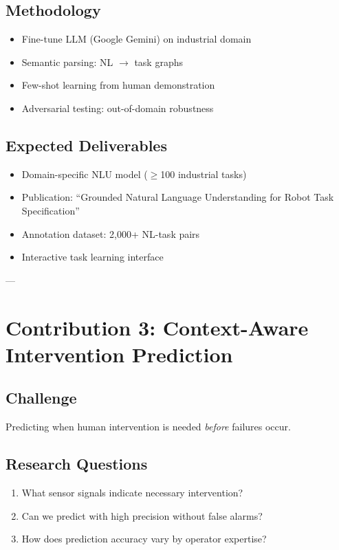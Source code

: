\documentclass[12pt,a4paper,oneside]{book}
\begin{document}
\subsection{Methodology}
\begin{itemize}
    \item Fine-tune LLM (Google Gemini) on industrial domain
    \item Semantic parsing: NL $\rightarrow$ task graphs
    \item Few-shot learning from human demonstration
    \item Adversarial testing: out-of-domain robustness
\end{itemize}

\subsection{Expected Deliverables}
\begin{tcolorbox}[colback=lightgreen, colframe=darkgreen]
\begin{itemize}
    \item Domain-specific NLU model ($\geq$100 industrial tasks)
    \item Publication: ``Grounded Natural Language Understanding for Robot Task Specification''
    \item Annotation dataset: 2,000+ NL-task pairs
    \item Interactive task learning interface
\end{itemize}
\end{tcolorbox}

---

\section{Contribution 3: Context-Aware Intervention Prediction}

\subsection{Challenge}
Predicting when human intervention is needed \textit{before} failures occur.

\subsection{Research Questions}
\begin{enumerate}
    \item What sensor signals indicate necessary intervention?
    \item Can we predict with high precision without false alarms?
    \item How does prediction accuracy vary by operator expertise?
\end{enumerate}
\end{document}

